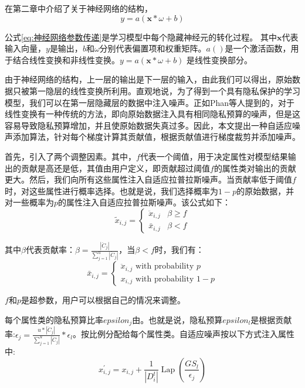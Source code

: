 在第二章中介绍了关于神经网络的结构，
\begin{equation}\label{eq:神经网络参数传递}
y=a(\mathbf{x} * \omega+b)
\end{equation}

公式\ref{eq:神经网络参数传递}是学习模型中每个隐藏神经元的转化过程。
其中$\mathbf{x}$代表输入向量，$y$是输出，$b$和$\omega$分别代表偏置项和权重矩阵。$a()$是一个激活函数，用于结合线性变换和非线性变换。$y=a(\mathbf{x} * \omega+b)$ 是线性变换部分。

由于神经网络的结构，上一层的输出是下一层的输入，由此我们可以得出，原始数据只被第一隐层的线性变换所利用。直观地说，为了得到一个具有隐私保护的学习模型，我们可以在第一层隐藏层的数据中注入噪声。正如Phan等人\cite{ref36}提到的，对于线性变换有一种传统的方法，即向原始数据注入具有相同隐私预算的噪声，但是这容易导致隐私预算增加，并且使原始数据失真过多。因此，本文提出一种自适应噪声添加算法，针对每个梯度计算其贡献值，根据贡献值进行梯度裁剪并添加噪声。

首先，引入了两个调整因素。其中，$f$代表一个阈值，用于决定属性对模型结果输出的贡献是高还是低，其值由用户定义，即贡献超过阈值$f$的属性类对输出的贡献更大。然后，我们向所有这些属性注入自适应拉普拉斯噪声。当贡献率低于阈值$f$时，对这些属性进行概率选择。也就是说，我们选择概率为$1-p$的原始数据，并对一些概率为$p$的属性注入自适应拉普拉斯噪声。该公式如下：
\begin{equation}\label{eq:神经网络加噪}
\tilde{x}_{i, j}=\left\{\begin{array}{ll}
\ddot{x}_{i, j} & \beta \geq f \\
\bar{x}_{i, j} & \beta<f
\end{array}\right.
\end{equation}

其中$\beta$代表贡献率：$\beta=\frac{\left|\ddot{C}_{j}\right|}{\sum_{j=1}^{u}\left|\ddot{C}_{j}\right|}$，当$\beta<f$时，我们有：
\begin{equation}\label{eq:神经网络加噪2}
\bar{x}_{i, j}=\left\{\begin{array}{l}
\ddot{x}_{i, j} \text { with probability } p \\
x_{i, j} \text { with probability } 1-p
\end{array}\right.
\end{equation}


$f$和$p$是超参数，用户可以根据自己的情况来调整。

每个属性类的隐私预算比率$epsilon_{j}$由。也就是说，隐私预算$epsilon_{l}$是根据贡献率:$\epsilon_{j}=\frac{u *\left|\ddot{C}_{j}\right|}{\sum_{j=1}^{u}\left|\ddot{C}_{j}\right|} * \epsilon_{l}$。按比例分配给每个属性类。自适应噪声按以下方式注入属性中:
\begin{equation}\label{eq:神经网络加噪3}
x_{i, j}^{\prime}=x_{i, j}+\frac{1}{\left|D_{i}^{t}\right|} \operatorname{Lap}\left(\frac{G S_{l}}{\epsilon_{j}}\right)
\end{equation}

